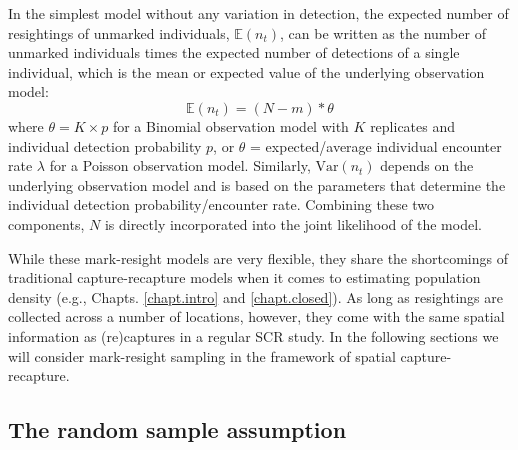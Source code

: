 In the simplest model %
without any variation in detection, the
expected number of resightings of unmarked individuals,
$\mathbb{E}(n_t)$, can be written as the number of unmarked
individuals times the expected number of detections of a single
individual, which is the mean or expected value of the underlying
observation model:
\begin{equation}
\mathbb{E}(n_t) = (N-m) * \theta
\end{equation}
\label{partialID.eq.E_n}
where $\theta = K \times p$ for a Binomial observation model with $K$
replicates and individual detection probability $p$, or $\theta$ =
expected/average individual encounter rate $\lambda$ for a Poisson
observation model. Similarly, $\mbox{Var}(n_t)$ depends on the
underlying observation model and is based on the parameters that
determine the individual detection probability/encounter
rate. Combining these two components, $N$ is directly incorporated
into the joint likelihood of the model.

While these mark-resight models are very flexible, they
share the shortcomings of traditional capture-recapture models
when it comes to estimating population density (e.g.,
Chapts. \ref{chapt.intro} and \ref{chapt.closed}). As long as
resightings are collected across a number of locations,
however, they come with the same spatial information as (re)captures in
a regular SCR study.
In the following sections we will consider mark-resight sampling in
the framework of spatial capture-recapture.


\subsection {The random sample assumption}
\label{partialID.sec.random}

